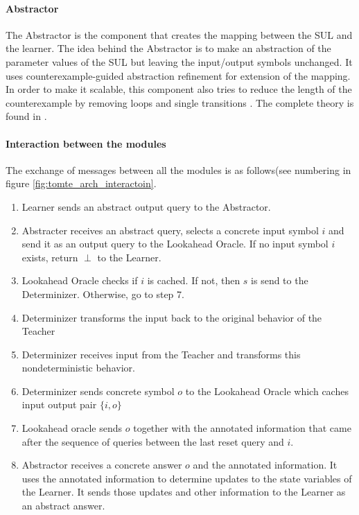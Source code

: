 \documentclass[multi,crop=false,class=article]{standalone}
\begin{document}
\paragraph{Abstractor} The Abstractor is the component that creates the mapping
between the SUL and the learner. The idea behind the Abstractor is to make an
abstraction of the parameter values of the SUL but leaving the input/output
symbols unchanged. It uses counterexample-guided abstraction
refinement\cite{Tomte2014} for extension of the mapping. In order to make it
scalable, this component also tries to reduce the length of the counterexample
by removing loops and single transitions \cite{Koopman2014}. The complete theory
is found in \cite{Tomte2014}.

\paragraph{Interaction between the modules} The exchange of messages between
all the modules is as follows(see numbering in figure
\ref{fig:tomte_arch_interactoin}.

\begin{enumerate}
	\item Learner sends an abstract output query to the Abstractor.
	\item Abstracter receives an abstract query, selects a concrete input
	symbol $i$ and send it as an output query to the Lookahead Oracle. If no
	input symbol $i$ exists, return $\perp$ to the Learner.
	\item Lookahead Oracle checks if $i$ is cached. If not, then $s$ is send
	to the Determinizer. Otherwise, go to step 7.
	\item Determinizer transforms the input back to the original behavior of
	the Teacher
	\item Determinizer receives input from the Teacher and transforms this
	nondeterministic behavior.
	\item Determinizer sends concrete symbol $o$ to the Lookahead Oracle which
	caches input output pair $\{i,o\}$
	\item Lookahead oracle sends $o$ together with the annotated information
	that came after the sequence of queries between the last reset query and
	$i$.
	\item Abstractor receives a concrete answer $o$ and the annotated
	information. It uses the annotated information to determine updates to the
	state variables of the Learner. It sends those updates and other
	information to the Learner as an abstract answer.
\end{enumerate}
\end{document}
